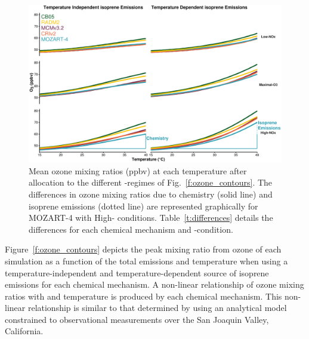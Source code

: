 \begin{figure}[t]%
    \centering%
    \caption{Mean ozone mixing ratios (ppbv) at each temperature after allocation to the different -regimes of Fig.~\ref{f:ozone_contours}. The differences in ozone mixing ratios due to chemistry (solid line) and isoprene emissions (dotted line) are represented graphically for MOZART-4 with High- conditions. Table~\ref{t:differences} details the differences for each chemical mechanism and -condition.}%
    \label{f:O3-T}%
    \includegraphics[width=\textwidth]{img/O3-T_correlation}%
    \vspace{-4mm}
\end{figure}

\begin{table}[t]%
    \centering%
    \caption{Increase in mean ozone mixing ratio (ppbv) due to chemistry (i.e. faster reaction rates) and temperature-dependent isoprene emissions from $20$~\degree C to $40$~\degree C in the -regimes of Fig.~\ref{f:O3-T}.}%
    \label{t:differences}%
    \vspace{-4mm}
\end{table}

Figure~\ref{f:ozone_contours} depicts the peak mixing ratio from ozone of each simulation as a function of the total  emissions and temperature when using a temperature-independent and temperature-dependent source of isoprene emissions for each chemical mechanism.
A non-linear relationship of ozone mixing ratios with  and temperature is produced by each chemical mechanism.
This non-linear relationship is similar to that determined by \citet{Pusede:2014} using an analytical model constrained to observational measurements over the San Joaquin Valley, California.

